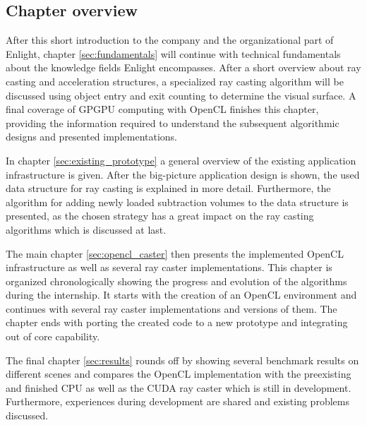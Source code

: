 \subsection{Chapter overview}

After this short introduction to the company and the organizational part of Enlight,  chapter \ref{sec:fundamentals} will continue with technical fundamentals about the knowledge fields Enlight encompasses. After a short overview about ray casting and acceleration structures, a specialized ray casting algorithm will be discussed using object entry and exit counting to determine the visual surface. A final coverage of GPGPU computing with OpenCL finishes this chapter, providing the information required to understand the subsequent algorithmic designs and presented implementations.

In chapter \ref{sec:existing_prototype} a general overview of the existing application infrastructure is given. After the big-picture application design is shown, the used data structure for ray casting is explained in more detail. Furthermore, the algorithm for adding newly loaded subtraction volumes to the data structure is presented, as the chosen strategy has a great impact on the ray casting algorithms which is discussed at last.

The main chapter \ref{sec:opencl_caster} then presents the implemented OpenCL infrastructure as well as several ray caster implementations. This chapter is organized chronologically showing the progress and evolution of the algorithms during the internship. It starts with the creation of an OpenCL environment and continues with several ray caster implementations and versions of them. The chapter ends with porting the created code to a new prototype and integrating out of core capability.

The final chapter \ref{sec:results} rounds off by showing several benchmark results on different scenes and compares the OpenCL implementation with the preexisting and finished CPU as well as the CUDA ray caster which is still in development. Furthermore, experiences during development are shared and existing problems discussed.
 
